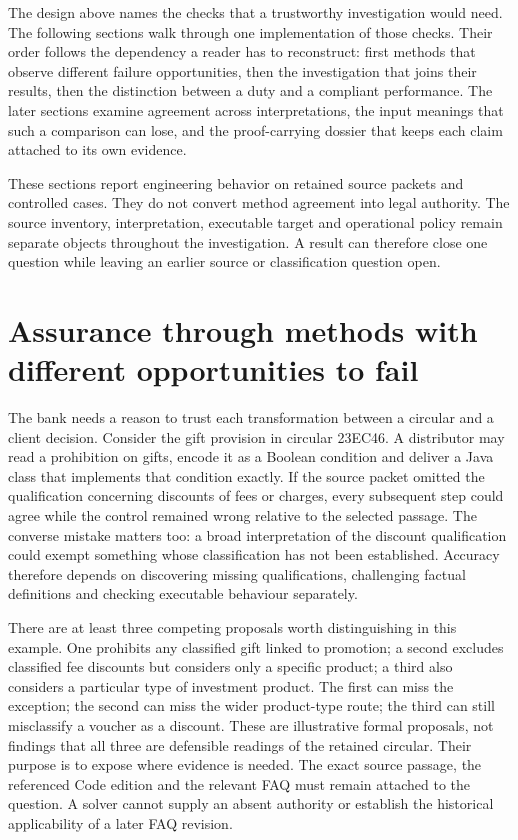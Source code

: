 \documentclass[12pt,a4paper,oneside,openany]{book}
\begin{document}
The design above names the checks that a trustworthy investigation would need.
The following sections walk through one implementation of those checks. Their
order follows the dependency a reader has to reconstruct: first methods that
observe different failure opportunities, then the investigation that joins their
results, then the distinction between a duty and a compliant performance. The
later sections examine agreement across interpretations, the input meanings
that such a comparison can lose, and the proof-carrying dossier that keeps each
claim attached to its own evidence.

These sections report engineering behavior on retained source packets and
controlled cases. They do not convert method agreement into legal authority.
The source inventory, interpretation, executable target and operational policy
remain separate objects throughout the investigation. A result can therefore
close one question while leaving an earlier source or classification question
open.

\section{Assurance through methods with different opportunities to fail}
\label{sec:diverse-assurance-round11}

The bank needs a reason to trust each transformation between a circular and a
client decision. Consider the gift provision in circular 23EC46. A distributor
may read a prohibition on gifts, encode it as a Boolean condition and deliver a
Java class that implements that condition exactly. If the source packet omitted
the qualification concerning discounts of fees or charges, every subsequent
step could agree while the control remained wrong relative to the selected
passage. The converse mistake matters too: a broad interpretation of the
discount qualification could exempt something whose classification has not been
established. Accuracy therefore depends on discovering missing qualifications,
challenging factual definitions and checking executable behaviour separately.

There are at least three competing proposals worth distinguishing in this
example. One prohibits any classified gift linked to promotion; a second excludes
classified fee discounts but considers only a specific product; a third also
considers a particular type of investment product. The first can miss the
exception; the second can miss the wider product-type route; the third can still
misclassify a voucher as a discount. These are illustrative formal proposals,
not findings that all three are defensible readings of the retained circular.
Their purpose is to expose where evidence is needed. The exact source passage,
the referenced Code edition and the relevant FAQ must remain attached to the
question. A solver cannot supply an absent authority or establish the historical
applicability of a later FAQ revision.
\end{document}
